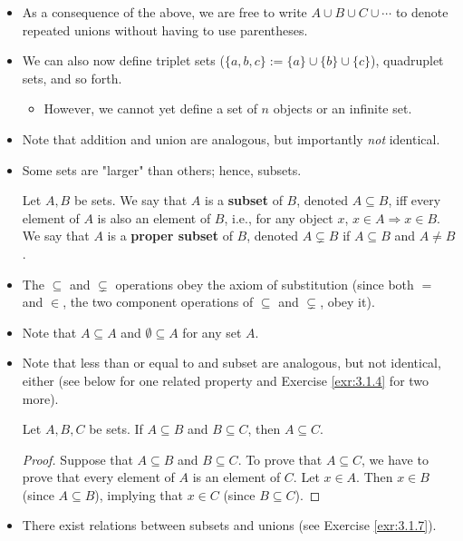 \documentclass[../main.tex]{subfiles}
\begin{document}
\begin{itemize}
\begin{lem}
\begin{proof}
        \end{proof}
    \end{lem}
    \item As a consequence of the above, we are free to write $A\cup B\cup C\cup\cdots$ to denote repeated unions without having to use parentheses.
    \item We can also now define triplet sets ($\{a,b,c\}:=\{a\}\cup\{b\}\cup\{c\}$), quadruplet sets, and so forth.
    \begin{itemize}
        \item However, we cannot yet define a set of $n$ objects or an infinite set.
    \end{itemize}
    \item Note that addition and union are analogous, but importantly \emph{not} identical.
    \item Some sets are "larger" than others; hence, subsets.
    \begin{dfn}[Subsets]\label{dfn:subsets}
        Let $A,B$ be sets. We say that $A$ is a \textbf{subset} of $B$, denoted $A\subseteq B$, iff every element of $A$ is also an element of $B$, i.e., for any object $x$, $x\in A \Longrightarrow x\in B$. We say that $A$ is a \textbf{proper subset} of $B$, denoted $A\subsetneq B$ if $A\subseteq B$ and $A\neq B$.
    \end{dfn}
    \item The $\subseteq$ and $\subsetneq$ operations obey the axiom of substitution (since both $=$ and $\in$, the two component operations of $\subseteq$ and $\subsetneq$, obey it).
    \item Note that $A\subseteq A$ and $\emptyset\subseteq A$ for any set $A$.
    \item Note that less than or equal to and subset are analogous, but not identical, either (see below for one related property and Exercise \ref{exr:3.1.4} for two more).
    \begin{prp}
        Let $A,B,C$ be sets. If $A\subseteq B$ and $B\subseteq C$, then $A\subseteq C$.
        \begin{proof}
            Suppose that $A\subseteq B$ and $B\subseteq C$. To prove that $A\subseteq C$, we have to prove that every element of $A$ is an element of $C$. Let $x\in A$. Then $x\in B$ (since $A\subseteq B$), implying that $x\in C$ (since $B\subseteq C$).
        \end{proof}
    \end{prp}
    \item There exist relations between subsets and unions (see Exercise \ref{exr:3.1.7}).

\end{itemize}
\end{document}

